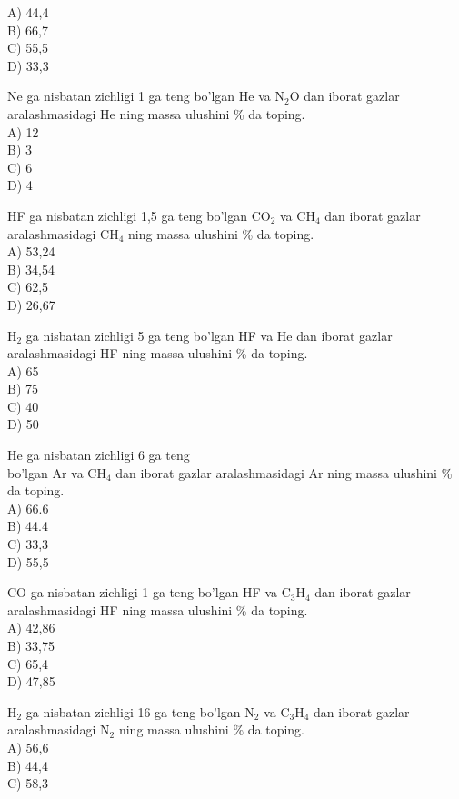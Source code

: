 A) 44,4\\
B) 66,7\\
C) 55,5\\
D) 33,3
  \item Ne ga nisbatan zichligi 1 ga teng bo'lgan He va $\mathrm{N}_{2} \mathrm{O}$ dan iborat gazlar aralashmasidagi He ning massa ulushini \% da toping.\\
A) 12\\
B) 3\\
C) 6\\
D) 4
  \item HF ga nisbatan zichligi 1,5 ga teng bo'lgan $\mathrm{CO}_{2}$ va $\mathrm{CH}_{4}$ dan iborat gazlar aralashmasidagi $\mathrm{CH}_{4}$ ning massa ulushini \% da toping.\\
A) 53,24\\
B) 34,54\\
C) 62,5\\
D) 26,67
  \item $\mathrm{H}_{2}$ ga nisbatan zichligi 5 ga teng bo'lgan HF va He dan iborat gazlar aralashmasidagi HF ning massa ulushini \% da toping.\\
A) 65\\
B) 75\\
C) 40\\
D) 50
  \item He ga nisbatan zichligi 6 ga teng\\
bo'lgan Ar va $\mathrm{CH}_{4}$ dan iborat gazlar aralashmasidagi Ar ning massa ulushini \% da toping.\\
A) 66.6\\
B) 44.4\\
C) 33,3\\
D) 55,5
  \item CO ga nisbatan zichligi 1 ga teng bo'lgan HF va $\mathrm{C}_{3} \mathrm{H}_{4}$ dan iborat gazlar aralashmasidagi HF ning massa ulushini \% da toping.\\
A) 42,86\\
B) 33,75\\
C) 65,4\\
D) 47,85
  \item $\mathrm{H}_{2}$ ga nisbatan zichligi 16 ga teng bo'lgan $\mathrm{N}_{2}$ va $\mathrm{C}_{3} \mathrm{H}_{4}$ dan iborat gazlar aralashmasidagi $\mathrm{N}_{2}$ ning massa ulushini $\%$ da toping.\\
A) 56,6\\
B) 44,4\\
C) 58,3\\
